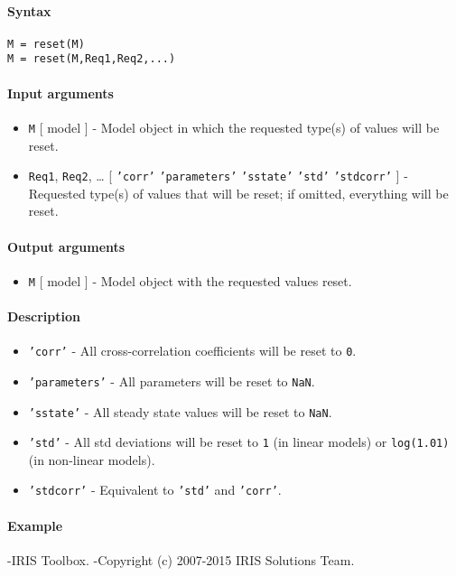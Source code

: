 


	\paragraph{Syntax}

\begin{verbatim}
M = reset(M)
M = reset(M,Req1,Req2,...)
\end{verbatim}

\paragraph{Input arguments}

\begin{itemize}
\item
  \texttt{M} {[} model {]} - Model object in which the requested type(s)
  of values will be reset.
\item
  \texttt{Req1}, \texttt{Req2}, \ldots{} {[} \texttt{'corr'} \textbar{}
  \texttt{'parameters'} \textbar{} \texttt{'sstate'} \textbar{}
  \texttt{'std'} \textbar{} \texttt{'stdcorr'} {]} - Requested type(s)
  of values that will be reset; if omitted, everything will be reset.
\end{itemize}

\paragraph{Output arguments}

\begin{itemize}
\itemsep1pt\parskip0pt
\item
  \texttt{M} {[} model {]} - Model object with the requested values
  reset.
\end{itemize}

\paragraph{Description}

\begin{itemize}
\item
  \texttt{'corr'} - All cross-correlation coefficients will be reset to
  \texttt{0}.
\item
  \texttt{'parameters'} - All parameters will be reset to \texttt{NaN}.
\item
  \texttt{'sstate'} - All steady state values will be reset to
  \texttt{NaN}.
\item
  \texttt{'std'} - All std deviations will be reset to \texttt{1} (in
  linear models) or \texttt{log(1.01)} (in non-linear models).
\item
  \texttt{'stdcorr'} - Equivalent to \texttt{'std'} and \texttt{'corr'}.
\end{itemize}

\paragraph{Example}

-IRIS Toolbox. -Copyright (c) 2007-2015 IRIS Solutions Team.


